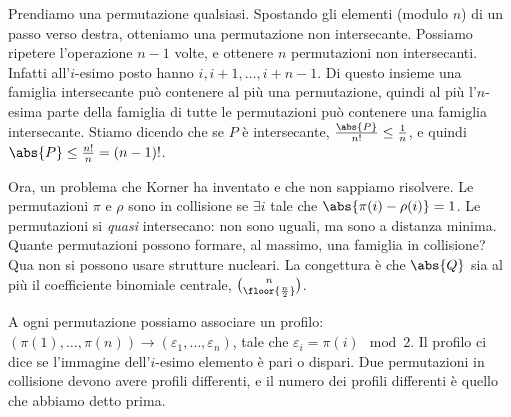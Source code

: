 Prendiamo una permutazione qualsiasi.
Spostando gli elementi (modulo $n$) di un passo verso destra, otteniamo una permutazione non intersecante.
Possiamo ripetere l'operazione $n-1$ volte, e ottenere $n$ permutazioni non intersecanti.
Infatti all'$i$-esimo posto hanno $i,i+1,\dots,i+n-1$.
Di questo insieme una famiglia intersecante pu\`o contenere al pi\`u una permutazione, quindi al pi\`u l'$n$-esima parte della famiglia di tutte le permutazioni pu\`o contenere una famiglia intersecante.
Stiamo dicendo che se $P$ \`e intersecante, $\frac{\abs{P}}{n!} \le \frac{1}{n}$, e quindi $\abs{P} \le \frac{n!}{n} = (n-1)!$.

Ora, un problema che Korner ha inventato e che non sappiamo risolvere.
Le permutazioni $\pi$ e $\rho$ sono in collisione se $\exists i$ tale che $\abs{\pi(i) - \rho(i)} = 1$.
Le permutazioni si \emph{quasi} intersecano: non sono uguali, ma sono a distanza minima.
Quante permutazioni possono formare, al massimo, una famiglia in collisione?
Qua non si possono usare strutture nucleari.
La congettura \`e che $\abs{Q}$ sia al pi\`u il coefficiente binomiale centrale, $\binom{n}{\floor{\frac{n}{2}}}$.

A ogni permutazione possiamo associare un profilo: $(\pi(1), \dots, \pi(n)) \to (\varepsilon_1, \dots, \varepsilon_n)$, tale che $\varepsilon_i = \pi(i) \mod 2$.
Il profilo ci dice se l'immagine dell'$i$-esimo elemento \`e pari o dispari.
Due permutazioni in collisione devono avere profili differenti, e il numero dei profili differenti \`e quello che abbiamo detto prima.






